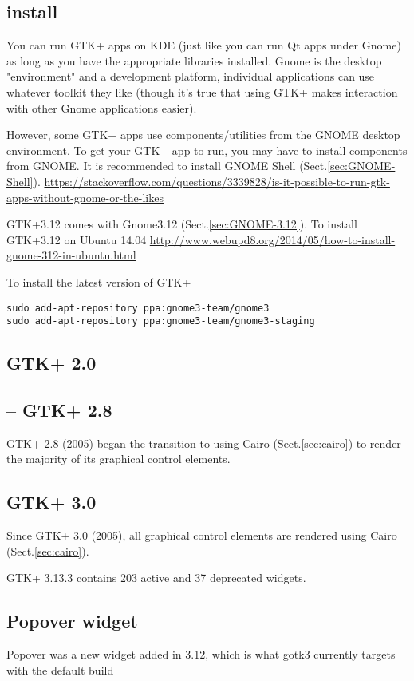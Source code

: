 \subsection{install}

You can run GTK+ apps on KDE (just like you can run Qt apps under Gnome) as long
as you have the appropriate libraries installed. Gnome is the desktop
"environment" and a development platform, individual applications can use
whatever toolkit they like (though it's true that using GTK+ makes interaction
with other Gnome applications easier).

However, some GTK+ apps use components/utilities from the GNOME desktop
environment. To get your GTK+ app to run, you may have to install components
from GNOME. It is recommended to install GNOME
Shell (Sect.\ref{sec:GNOME-Shell}).
\url{https://stackoverflow.com/questions/3339828/is-it-possible-to-run-gtk-apps-without-gnome-or-the-likes}


GTK+3.12 comes with Gnome3.12 (Sect.\ref{sec:GNOME-3.12}). To install GTK+3.12
on Ubuntu 14.04
\url{http://www.webupd8.org/2014/05/how-to-install-gnome-312-in-ubuntu.html}


To install the latest version of GTK+
\begin{verbatim}
sudo add-apt-repository ppa:gnome3-team/gnome3
sudo add-apt-repository ppa:gnome3-team/gnome3-staging
\end{verbatim}

 \subsection{GTK+ 2.0}
 
 \subsection{-- GTK+ 2.8}
 \label{sec:GTK+-2.8}
 
GTK+ 2.8 (2005) began the transition to using Cairo (Sect.\ref{sec:cairo}) to
render the majority of its graphical control elements.
 
 \subsection{GTK+ 3.0}

Since GTK+ 3.0 (2005), all graphical control elements are rendered using
Cairo (Sect.\ref{sec:cairo}).
 
GTK+ 3.13.3 contains 203 active and 37 deprecated widgets.

\subsection{Popover widget}
\label{sec:Popover-widget}

Popover was a new widget added in 3.12, which is what gotk3 currently targets
with the default build

